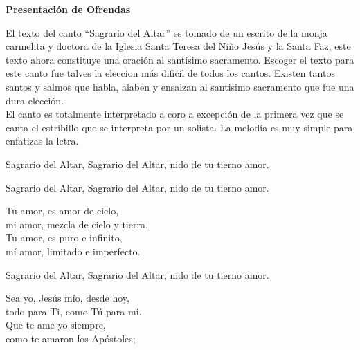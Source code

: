 \documentclass[12pt, letterpaper]{report}
\begin{document}


    
    \begin{center}
        \Huge {\bfseries Presentaci\'on de Ofrendas}
    \end{center}

    \Large El texto del canto ``Sagrario del Altar'' es tomado de un escrito de la monja carmelita y doctora de la Iglesia Santa Teresa del Ni\~no Jes\'us y la Santa Faz, este texto ahora constituye una oraci\'on al sant\'isimo sacramento. Escoger el texto para este canto fue talves la eleccion m\'as dificil de todos los cantos. Existen tantos santos y salmos que habla, alaben y ensalzan al santisimo sacramento que fue una dura elecci\'on.\\
    El canto es totalmente interpretado a coro a excepci\'on de la primera vez que se canta el estribillo que se interpreta por un solista. La melod\'ia es muy simple para enfatizas la letra.

    \noindent
    \LARGE Sagrario del Altar, Sagrario del Altar, nido de tu tierno amor.

    \noindent
    Sagrario del Altar, Sagrario del Altar, nido de tu tierno amor.

    \noindent
    Tu amor, es amor de cielo,\\
    mi amor, mezcla de cielo y tierra.\\
    Tu amor, es puro e infinito,\\
    m\'i amor, limitado e imperfecto.

    \noindent
    Sagrario del Altar, Sagrario del Altar, nido de tu tierno amor.

    \noindent
    Sea yo, Jes\'us m\'io, desde hoy,\\
    todo para Ti, como T\'u para mi.\\
    Que te ame yo siempre,\\
    como te amaron los Ap\'ostoles;
\end{document}
